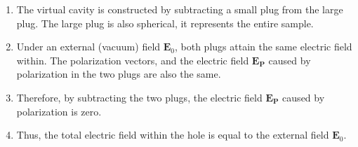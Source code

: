 \documentclass[11pt]{article}
\newcommand{\vct}[1]{\boldsymbol{\mathbf{#1}}}
\newcommand{\vE}{\vct{E}}
\newcommand{\vP}{\vct{P}}
\begin{document}
\begin{enumerate}

\item
The virtual cavity is constructed
by subtracting a small plug from the large plug.
The large plug is also spherical,
it represents the entire sample.

\item
Under an external (vacuum) field $\vE_0$,
both plugs attain the same electric field within.
The polarization vectors,
and the electric field $\vE_{\vP}$
caused by polarization
in the two plugs are also the same.

\item
Therefore, by subtracting the two plugs,
the electric field $\vE_{\vP}$
caused by polarization
is zero.

\item
Thus, the total electric field
within the hole is equal to the external field
$\vE_0$.

\end{enumerate}





\end{document}

